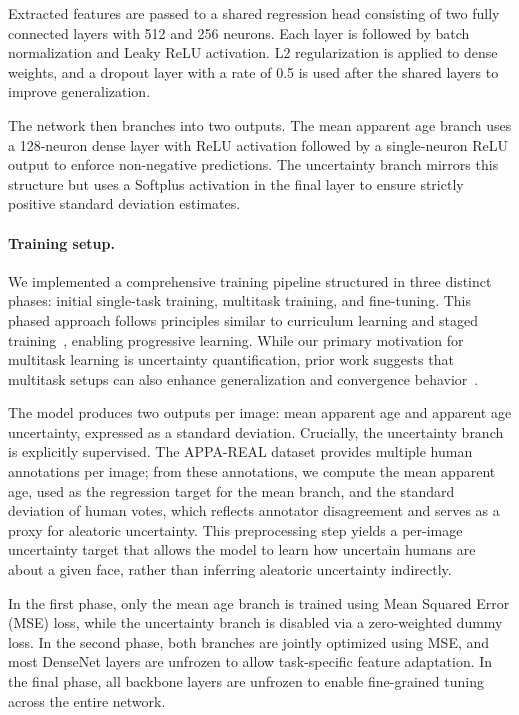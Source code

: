 \documentclass[runningheads]{llncs}
\begin{document}
Extracted features are passed to a shared regression head consisting of two fully connected layers with 512 and 256 neurons. Each layer is followed by batch normalization and Leaky ReLU activation. L2 regularization is applied to dense weights, and a dropout layer with a rate of 0.5 is used after the shared layers to improve generalization.

The network then branches into two outputs. The mean apparent age branch uses a 128-neuron dense layer with ReLU activation followed by a single-neuron ReLU output to enforce non-negative predictions. The uncertainty branch mirrors this structure but uses a Softplus activation in the final layer to ensure strictly positive standard deviation estimates.

\paragraph{Training setup.}
We implemented a comprehensive training pipeline structured in three distinct phases: initial single-task training, multitask training, and fine-tuning. This phased approach follows principles similar to curriculum learning and staged training~\cite{bengio2009curriculum,howard2018universal}, enabling progressive learning. While our primary motivation for multitask learning is uncertainty quantification, prior work suggests that multitask setups can also enhance generalization and convergence behavior~\cite{caruana1997multitask}.

The model produces two outputs per image: mean apparent age and apparent age uncertainty, expressed as a standard deviation. Crucially, the uncertainty branch is explicitly supervised. The APPA-REAL dataset provides multiple human annotations per image; from these annotations, we compute the mean apparent age, used as the regression target for the mean branch, and the standard deviation of human votes, which reflects annotator disagreement and serves as a proxy for aleatoric uncertainty. This preprocessing step yields a per-image uncertainty target that allows the model to learn how uncertain humans are about a given face, rather than inferring aleatoric uncertainty indirectly.

In the first phase, only the mean age branch is trained using Mean Squared Error (MSE) loss, while the uncertainty branch is disabled via a zero-weighted dummy loss. In the second phase, both branches are jointly optimized using MSE, and most DenseNet layers are unfrozen to allow task-specific feature adaptation. In the final phase, all backbone layers are unfrozen to enable fine-grained tuning across the entire network.
\end{document}
